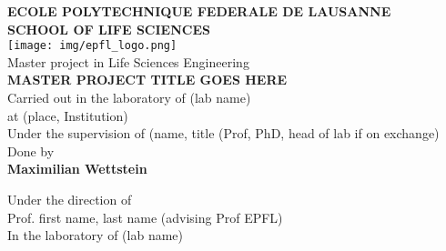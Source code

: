 \setmainfont{Arial}
\begin{titlepage}
\center %


\textbf{\large ECOLE POLYTECHNIQUE FEDERALE DE LAUSANNE}\\ %
\textbf{\large SCHOOL OF LIFE SCIENCES}\\[0.5cm] %
\texttt{[image: img/epfl\_logo.png]}\\[0.5cm] %
\large{Master project in Life Sciences Engineering}\\[1.5cm] %


\textbf{\Large \textbf{MASTER PROJECT TITLE GOES HERE}}\\[1cm]

Carried out in the laboratory of (lab name) \\
at (place, Institution)\\
Under the supervision of (name, title (Prof, PhD, head of lab if on exchange) \\[1cm]


Done by\\[0.5cm]

\textbf{\large Maximilian Wettstein}\\[0.75cm]

\parbox{\textwidth}{
\centering Under the direction of \\
Prof. first name, last name (advising Prof EPFL)\\
In the laboratory of (lab name)\\
}\\[0.75cm] 


\end{titlepage}
